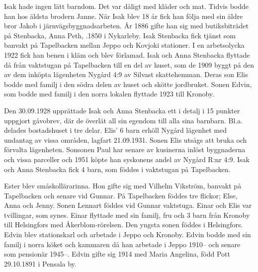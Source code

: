 Isak hade ingen lätt barndom. Det var dåligt med kläder och mat. Tidvis bodde han hos äldsta brodern Janne. När Isak blev 18 år fick han följa med sin äldre bror Jakob i järnvägsbyggnadsarbeten. År 1886 gifte han sig med butiksbiträdet på Stenbacka, Anna Peth, .1850 i Nykarleby. Isak Stenbacka fick tjänst som banvakt på Tapelbacken mellan Jeppo och Kovjoki stationer. I en arbetsolycka 1922 fick han benen i kläm och blev förlamad. Isak och Anna Stenbacka flyttade då från vaktstugan på Tapelbacken till en del av huset, som de 1909 byggt på den av dem inköpta lägenheten Nygård 4:9 av Silvast skattehemman.  Deras son Elis bodde med familj i den södra delen av huset och skötte jordbruket. Sonen Edvin, som bodde med familj i den norra lokalen flyttade 1923 till Kronoby.

Den 30.09.1928 upprättade Isak och Anna Stenbacka ett i detalj i 15 punkter uppgjort gåvobrev, där de överlät all sin egendom till alla sina barnbarn.  Bl.a. delades bostadshuset i tre delar. Elis' 6 barn erhöll Nygård lägenhet med undantag av vissa områden, lagfart 21.09.1931. Sonen Elis utsågs att bruka och förvalta lägenheten. Sonsonen Paul har senare av kusinerna inlöst byggnaderna och vissa parceller och 1951 köpte han syskonens andel av Nygård R:nr 4:9.
Isak och Anna Stenbacka fick 4 barn, som föddes i vaktstugan på Tapelbacken.
\begin{jhchildren}
  \item {}
  \item {}
  \item {}
  \item {}
\end{jhchildren}
Ester blev småskollärarinna. Hon gifte sig med Vilhelm Vikström, banvakt på Tapelbacken och senare vid Gunnar. På Tapelbacken föddes tre flickor; Else, Anna och Jenny. Sonen Lennart föddes vid Gunnar vaktstuga.
Einar och Elis var tvillingar, som synes. Einar flyttade med sin familj, fru och 3 barn från Kronoby till Helsingfors med Åkerblom-rörelsen. Den yngsta sonen föddes i Helsingfors. Edvin blev stationskarl och arbetade i Jeppo och Kronoby. Edvin bodde med sin familj i norra köket och kammaren då han arbetade i Jeppo 1910-- och senare som pensionär 1945--. Edvin gifte sig 1914 med Maria Angelina, född Pott 29.10.1891 i Pensala by.
\begin{jhchildren}
  \item {}
  \item {}
  \item {}
  \item {}
\end{jhchildren}
